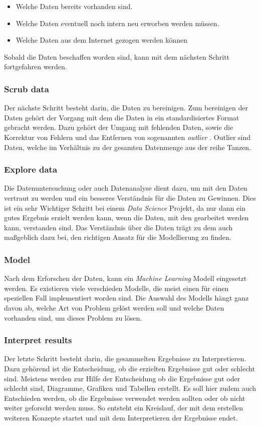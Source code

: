 \begin{itemize}
    \item Welche Daten bereits vorhanden sind.
    \item Welche Daten eventuell noch intern neu erworben werden müssen.
    \item Welche Daten aus dem Internet gezogen werden können
\end{itemize}

Sobald die Daten beschaffen worden sind, kann mit dem nächsten Schritt fortgefahren werden.

\subsubsection{Scrub data}
Der nächste Schritt besteht darin, die Daten zu bereinigen. Zum bereinigen der Daten gehört der Vorgang mit dem die Daten in ein standardisiertes Format gebracht werden. Dazu gehört der Umgang mit fehlenden Daten, sowie die Korrektur von Fehlern und das Entfernen von sogenannten \emph{outlier} \cite{Vorgehen_ds}. Outlier sind Daten, welche im Verhältnis zu der gesamten Datenmenge aus der reihe Tanzen. 

\subsubsection{Explore data}
Die Datenuntersuchung oder auch Datenanalyse dient dazu, um mit den Daten vertraut zu werden und ein besseres Verständnis für die Daten zu Gewinnen. Dies ist ein sehr Wichtiger Schritt bei einem \emph{Data Science} Projekt, da nur dann ein gutes Ergebnis erzielt werden kann, wenn die Daten, mit den gearbeitet werden kann, verstanden sind. Das Verständnis über die Daten trägt zu dem auch maßgeblich dazu bei, den richtigen Ansatz für die Modellierung zu finden.

\subsubsection{Model}
Nach dem Erforschen der Daten, kann ein \emph{Machine Learning} Modell eingesetzt werden. Es existieren viele verschieden Modelle, die meist einen für einen speziellen Fall implementiert worden sind. Die Auswahl des Modells hängt ganz davon ab, welche Art von Problem gelöst werden soll und welche Daten vorhanden sind, um dieses Problem zu lösen. 

\subsubsection{Interpret results}
Der letzte Schritt besteht darin, die gesammelten Ergebnisse zu Interpretieren. Dazu gehörend ist die Entscheidung, ob die erzielten Ergebnisse gut oder schlecht sind. Meistens werden zur Hilfe der Entscheidung ob die Ergebnisse gut oder schlecht sind, Diagramme, Grafiken und Tabellen erstellt. Es soll hier zudem auch Entschieden werden, ob die Ergebnisse verwendet werden sollten oder ob nicht weiter geforscht werden muss. So entsteht ein Kreislauf, der mit dem erstellen weiteren Konzepte startet und mit dem Interpretieren der Ergebnisse endet. 
